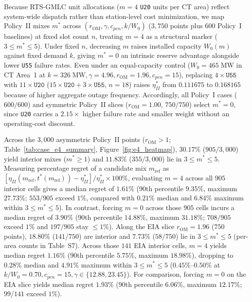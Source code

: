 \documentclass{elektr}
\begin{document}
Because RTS-GMLC unit allocations ($m = 4$ \texttt{U20} units per CT area) reflect system-wide dispatch rather than station-level cost minimization, we map Policy~II mixes $m^*$ across $(r_{\mathrm{OM}}, \gamma, c_{pen}, k/W_0)$ ($3{,}750$ points plus $600$ Policy~I baselines) at fixed slot count $n$, treating $m = 4$ as a structural marker ($3 \le m^* \le 5$). Under fixed $n$, decreasing $m$ raises installed capacity $W_0(m)$ against fixed demand $k$, giving $m^* = 0$ an intrinsic reserve advantage alongside lower \texttt{U55} failure rates. Even under an equal-capacity control ($W_0 = 465\;\text{MW}$ in CT Area~1 at $k = 326\;\text{MW}, \gamma = 4.96, r_{\mathrm{OM}} = 1.96, c_{pen} = 15$), replacing $4\times\texttt{U55}$ with $11\times\texttt{U20}$ ($15\times\texttt{U20}+3\times\texttt{U55}$, $n=18$) raises $\eta_{II}^*$ from $0.111675$ to $0.168165$ because of higher aggregate outage frequency. Accordingly, all Policy~I cases ($600/600$) and symmetric Policy~II slices ($r_{\mathrm{OM}} = 1.00$, $750/750$) select $m^* = 0$, since \texttt{U20} carries a $2.15\times$ higher failure rate and smaller weight without an operating-cost discount.

Across the $3{,}000$ asymmetric Policy~II points ($r_{\mathrm{OM}} > 1$; Table~\ref{tab:case_e4_summary}, Figure~\ref{fig:e4_heatmap}), $30.17\%$ ($905/3{,}000$) yield interior mixes ($m^* \ge 1$) and $11.83\%$ ($355/3{,}000$) lie in $3 \le m^* \le 5$. Measuring percentage regret of a candidate mix $m_{\mathrm{ref}}$ as $[\eta_{II}(m_{\mathrm{ref}}, t^*(m_{\mathrm{ref}})) - \eta_{II}^*]/\eta_{II}^* \times 100\%$, evaluating $m = 4$ across all $905$ interior cells gives a median regret of $1.61\%$ (90th percentile $9.35\%$, maximum $27.73\%$; $553/905$ exceed $1\%$, compared with $0.21\%$ median and $6.84\%$ maximum within $3 \le m^* \le 5$). In contrast, forcing $m = 0$ across those $905$ cells incurs a median regret of $3.90\%$ (90th percentile $14.88\%$, maximum $31.18\%$; $708/905$ exceed $1\%$ and $197/905$ stay $\le 1\%$). Along the EIA slice $r_{\mathrm{OM}} = 1.96$ ($750$ points), $18.80\%$ ($141/750$) are interior and $7.73\%$ ($58/750$) lie in $3 \le m^* \le 5$ (per-area counts in Table~S7). Across those $141$ EIA interior cells, $m = 4$ yields median regret $1.16\%$ (90th percentile $5.75\%$, maximum $18.98\%$), dropping to $0.28\%$ median and $4.91\%$ maximum within $3 \le m^* \le 5$ ($0.45\%$--$0.50\%$ at $k/W_0 = 0.70, c_{pen} = 15, \gamma \in \{12.88, 23.45\}$). For comparison, forcing $m = 0$ on the EIA slice yields median regret $1.93\%$ (90th percentile $6.06\%$, maximum $12.17\%$; $99/141$ exceed $1\%$).
\end{document}
